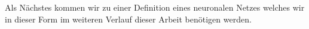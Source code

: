Als Nächstes kommen wir zu einer Definition eines neuronalen Netzes welches wir in dieser Form im weiteren Verlauf dieser Arbeit benötigen werden.
